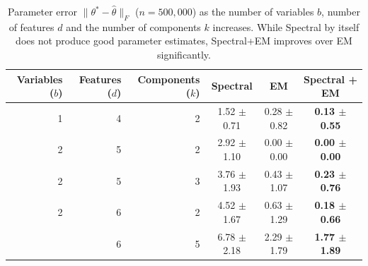 
\begin{table}[tbhp]
\caption{Parameter error $\|\theta^* - \hat \theta\|_F$ ($n = 500,000$)
as the number of variables $b$, number of features $d$ and the number of components $k$ increases.
While Spectral by itself does not produce good parameter estimates, Spectral+EM improves
over EM significantly.
}
\label{tbl:parameter-recovery}
\vskip 0.15in
\begin{center}
\begin{small}
\begin{sc}

  \begin{tabular}{ r r r c c c }
\hline
\abovespace\belowspace
Variables ($b$) & Features ($d$) & Components ($k$) & Spectral & EM & Spectral + EM \\
\hline
\abovespace
  1 & 4 & 2 & 1.52 $\pm$ 0.71 & 0.28 $\pm$ 0.82 & {\bf 0.13 $\pm$ 0.55} \\
  2 & 5 & 2 & 2.92 $\pm$ 1.10 & 0.00 $\pm$ 0.00 & {\bf 0.00 $\pm$ 0.00} \\
  2 & 5 & 3 & 3.76 $\pm$ 1.93 & 0.43 $\pm$ 1.07 & {\bf 0.23 $\pm$ 0.76} \\
  2 & 6 & 2 & 4.52 $\pm$ 1.67 & 0.63 $\pm$ 1.29 & {\bf 0.18 $\pm$ 0.66} \\
\belowspace
  2 & 6 & 5 & 6.78 $\pm$ 2.18 & 2.29 $\pm$ 1.79 & {\bf 1.77 $\pm$ 1.89} \\


\hline

\end{tabular}
\end{sc}
\end{small}
\end{center}
\vskip -0.1in
\end{table}

